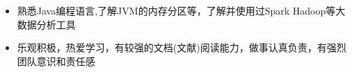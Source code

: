   \begin{itemize}[leftmargin=*]
    \item {熟悉Java编程语言,了解JVM的内存分区等，了解并使用过Spark Hadoop等大数据分析工具}
    \item {乐观积极，热爱学习，有较强的文档(文献)阅读能力，做事认真负责，有强烈团队意识和责任感}
  \end{itemize}